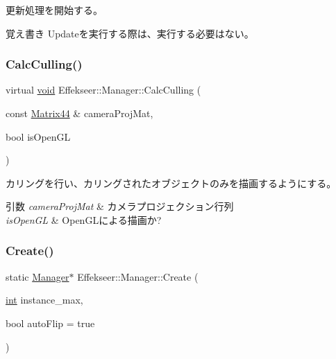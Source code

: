 更新処理を開始する。 

\begin{DoxyNote}{覚え書き}
Updateを実行する際は、実行する必要はない。 
\end{DoxyNote}
\mbox{\label{class_effekseer_1_1_manager_a95c20ca6352c0e68a6fa1d271bcabc1f}} 
\subsubsection{\texorpdfstring{Calc\+Culling()}{CalcCulling()}}
{\footnotesize\ttfamily virtual \mbox{\hyperlink{namespace_effekseer_ab34c4088e512200cf4c2716f168deb56}{void}} Effekseer\+::\+Manager\+::\+Calc\+Culling (\begin{DoxyParamCaption}\item[{const \mbox{\hyperlink{struct_effekseer_1_1_matrix44}{Matrix44}} \&}]{camera\+Proj\+Mat,  }\item[{bool}]{is\+Open\+GL }\end{DoxyParamCaption})\hspace{0.3cm}{\ttfamily [pure virtual]}}



カリングを行い、カリングされたオブジェクトのみを描画するようにする。 


\begin{DoxyParams}{引数}
{\em camera\+Proj\+Mat} & カメラプロジェクション行列 \\
\hline
{\em is\+Open\+GL} & Open\+G\+Lによる描画か? \\
\hline
\end{DoxyParams}
\mbox{\label{class_effekseer_1_1_manager_a1de74a159f3646d325f49e940e72181c}} 
\subsubsection{\texorpdfstring{Create()}{Create()}}
{\footnotesize\ttfamily static \mbox{\hyperlink{class_effekseer_1_1_manager}{Manager}}$\ast$ Effekseer\+::\+Manager\+::\+Create (\begin{DoxyParamCaption}\item[{\mbox{\hyperlink{namespace_effekseer_ace0abf7c2e6947e519ebe8b54cbcc30a}{int}}}]{instance\+\_\+max,  }\item[{bool}]{auto\+Flip = {\ttfamily true} }\end{DoxyParamCaption})\hspace{0.3cm}{\ttfamily [static]}}



